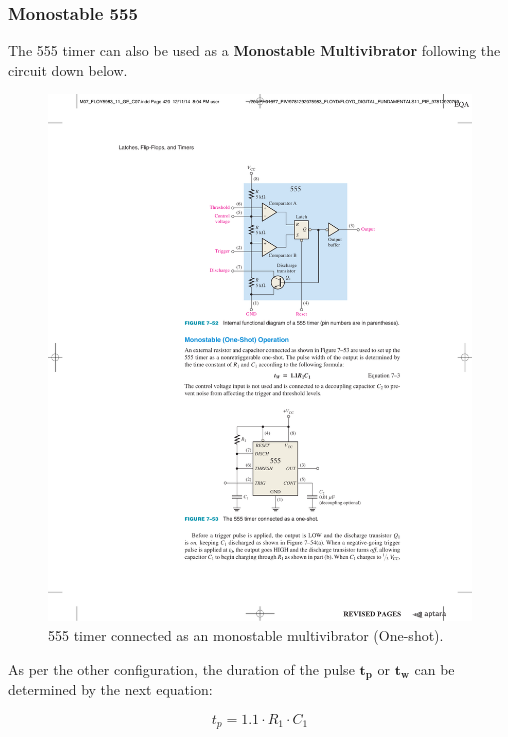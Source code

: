 \documentclass[a4paper, 11pt, oneside]{article}
\begin{document}
    
\subsubsection{Monostable 555}

The 555 timer can also be used as a \textbf{Monostable Multivibrator} following the circuit down below. 

\begin{figure}[H]
    \centering
    \includegraphics[scale = 1]{Graphics/Practice 2/GRAPHICS/555/GRAPHS/MODES/MONOSTABLE.pdf}
    \caption{555 timer connected as an monostable multivibrator (One-shot). ~\autocite{FLOYD}}
    \label{fig:MONOSTABLE}
\end{figure}

As per the other configuration, the duration of the pulse $\mathbf{t_{p}}$ or $\mathbf{t_{w}}$ can be determined by the next equation:

\begin{equation*}
    t_{p} = 1.1 \cdot R_1 \cdot C_1
\end{equation*}
\end{document}
